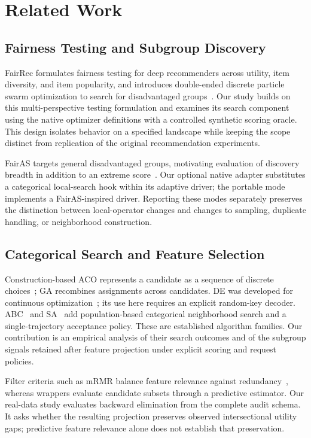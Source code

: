 \section{Related Work}
\label{sec:related}

\subsection{Fairness Testing and Subgroup Discovery}
FairRec formulates fairness testing for deep recommenders across utility, item diversity, and item popularity, and introduces double-ended discrete particle swarm optimization to search for disadvantaged groups~\cite{guo2023fairrec}. Our study builds on this multi-perspective testing formulation and examines its search component using the native optimizer definitions with a controlled synthetic scoring oracle. This design isolates behavior on a specified landscape while keeping the scope distinct from replication of the original recommendation experiments.

FairAS targets general disadvantaged groups, motivating evaluation of discovery breadth in addition to an extreme score~\cite{wu2025nobias}. Our optional native adapter substitutes a categorical local-search hook within its adaptive driver; the portable mode implements a FairAS-inspired driver. Reporting these modes separately preserves the distinction between local-operator changes and changes to sampling, duplicate handling, or neighborhood construction.

\subsection{Categorical Search and Feature Selection}
Construction-based ACO represents a candidate as a sequence of discrete choices~\cite{dorigo1996ants}; GA recombines assignments across candidates. DE was developed for continuous optimization~\cite{storn1997de}; its use here requires an explicit random-key decoder. ABC~\cite{karaboga2007abc} and SA~\cite{kirkpatrick1983sa} add population-based categorical neighborhood search and a single-trajectory acceptance policy. These are established algorithm families. Our contribution is an empirical analysis of their search outcomes and of the subgroup signals retained after feature projection under explicit scoring and request policies.

Filter criteria such as mRMR balance feature relevance against redundancy~\cite{peng2005mrmr}, whereas wrappers evaluate candidate subsets through a predictive estimator. Our real-data study evaluates backward elimination from the complete audit schema. It asks whether the resulting projection preserves observed intersectional utility gaps; predictive feature relevance alone does not establish that preservation.

